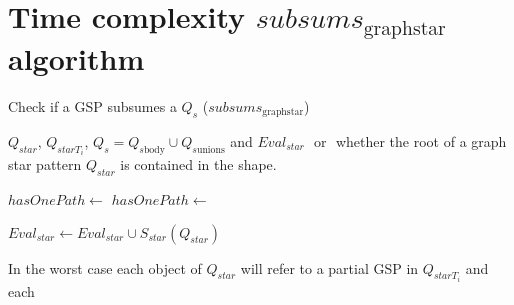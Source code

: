 \section{Time complexity $subsums_{\mathrm{graph star}}$ algorithm}


\begin{algorithm}[h]
    \caption{Check if a GSP subsumes a $Q_s$ ($subsums_{\mathrm{graph star}}$)}\label{alg:containmentTree}
    \begin{algorithmic}
       \scriptsize
 
       \REQUIRE  $Q_{star}$, $Q_{starT_i}$, $Q_s = Q_{s\mathrm{body}} \cup Q_{s\mathrm{unions}}$ and $Eval_{star}$
       \ENSURE \TRUE $ $ or \FALSE $ $ whether the root of a graph star pattern $Q_{star}$ is contained in the shape.
 
          \RETURN \TRUE
       \ENDIF 
 
             \STATE $hasOnePath \gets $ \FALSE
                   \STATE $hasOnePath \gets $ \TRUE
                \ENDIF
             \ENDFOR
                \RETURN \FALSE
             \ENDIF
          \ELSE
                   \RETURN \FALSE
                \ENDIF
             \ENDIF
          \ENDIF
       \ENDFOR
 
       \STATE $Eval_{star} \gets Eval_{star} \cup S_{star}(Q_{star})$
       \RETURN \TRUE
    \end{algorithmic}
 \end{algorithm}

 In the worst case each object of $Q_{star}$ will refer to a partial GSP in $Q_{starT_i}$ and each 